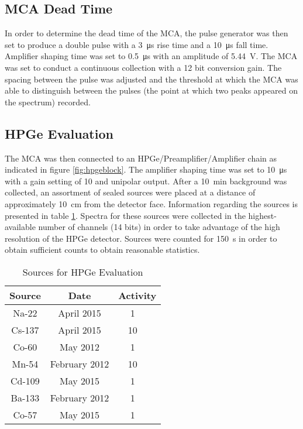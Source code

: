 \documentclass[12pt]{article}
\begin{document}
\subsection{MCA Dead Time}
In order to determine the dead time of the MCA, the pulse generator was then set to produce a double pulse with a \SI{3}{\micro\second} rise time and a \SI{10}{\micro\second} fall time. Amplifier shaping time was set to \SI{0.5}{\micro\second} with an amplitude of \SI{5.44}{\volt}. The MCA was set to conduct a continuous collection with a 12 bit conversion gain. The spacing between the pulse was adjusted and the threshold at which the MCA was able to distinguish between the pulses (the point at which two peaks appeared on the spectrum) recorded. 

\subsection{HPGe Evaluation}
The MCA was then connected to an HPGe/Preamplifier/Amplifier chain as indicated in figure \ref{fig:hpgeblock}. The amplifier shaping time was set to \SI{10}{\micro\second} with a gain setting of 10 and unipolar output. After a \SI{10}{\minute} background was collected, an assortment of sealed sources were placed at a distance of approximately \SI{10}{\centi\meter} from the detector face. Information regarding the sources is presented in table \ref{tab:hpgesources}. Spectra for these sources were collected in the highest-available number of channels (14 bits) in order to take advantage of the high resolution of the HPGe detector. Sources were counted for \SI{150}{\second} in order to obtain sufficient counts to obtain reasonable statistics.

\begin{center}
\begin{table}
	\centering
	\caption{Sources for HPGe Evaluation\label{tab:hpgesources}}
	\begin{tabular}{c c c}
		\hline\hline
		Source & Date & Activity \\
		\hline
		Na-22 & April 2015 & \SI{1}{\micro\curie} \\
		Cs-137 & April 2015 & \SI{10}{\micro\curie} \\
		Co-60 & May 2012 & \SI{1}{\micro\curie} \\
		Mn-54 & February 2012 & \SI{10}{\micro\curie} \\
		Cd-109 & May 2015 & \SI{1}{\micro\curie} \\
		Ba-133 & February 2012 & \SI{1}{\micro\curie} \\
		Co-57 & May 2015 & \SI{1}{\micro\curie} \\
		\hline
	\end{tabular}
\end{table}
\end{center}
\end{document}
